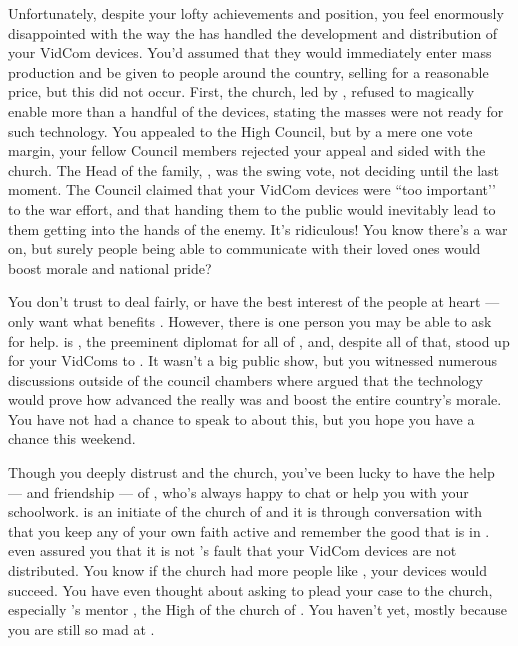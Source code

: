 \documentclass[char]{GL2020}
\begin{document}
Unfortunately, despite your lofty achievements and position, you feel enormously disappointed with the way the \pTech{} has handled the development and distribution of your VidCom devices.  You'd assumed that they would immediately enter mass production and be given to people around the country, selling for a reasonable price, but this did not occur. First, the church, led by \cAntiChup{\intro}, refused to magically enable more than a handful of the devices, stating the masses were not ready for such technology. You appealed to the High Council, but by a mere one vote margin, your fellow Council members rejected your appeal and sided with the church. The Head of the \cHeir{\formal} family, \cFaledonParent{\intro}, was the swing vote, not deciding until the last moment. The Council claimed that your VidCom devices were ``too important'’ to the war effort, and that handing them to the public would inevitably lead to them getting into the hands of the enemy. It's ridiculous!  You know there's a war on, but surely people being able to communicate with their loved ones would boost morale and national pride? 

You don't trust \cFaledonParent{} to deal fairly, or have the best interest of the people at heart — \cFaledonParent{\they} only want\cFaledonParent{\verbs} what benefits \cFaledonParent{\them}. However, there is one person you may be able to ask for help.  \cDiplomat{\intro} is \cFaledonParent{\sibling}, the preeminent diplomat for all of \pTech{}, and, despite all of that, stood up for your VidComs to \cFaledonParent{\them}.  It wasn’t a big public show, but you witnessed numerous discussions outside of the council chambers where \cDiplomat{} argued that the technology would prove how advanced the \pTech{} really was and boost the entire country’s morale.  You have not had a chance to speak to \cDiplomat{} about this, but you hope you have a chance this weekend.    

Though you deeply distrust \cAntiChup{} and the church, you've been lucky to have the help — and friendship — of \cScholarship{\intro}, who's always happy to chat or help you with your schoolwork. \cScholarship{} is an initiate of the church of \cTechGod{} and it is through conversation with \cScholarship{\them} that you keep any of your own faith active and remember the good that is in \cTechGod{}. \cScholarship{\Theyhave} even assured you that it is not \cTechGod{}’s fault that your VidCom devices are not distributed. You know if the church had more people like \cScholarship{}, your devices would succeed. You have even thought about asking \cScholarship{\them} to plead your case to the church, especially \cScholarship{}’s mentor \cAntiChup{}, the High \cAntiChup{\Cleric} of the church of \cTechGod{}. You haven’t yet, mostly because you are still so mad at \cAntiChup{}.
\end{document}
